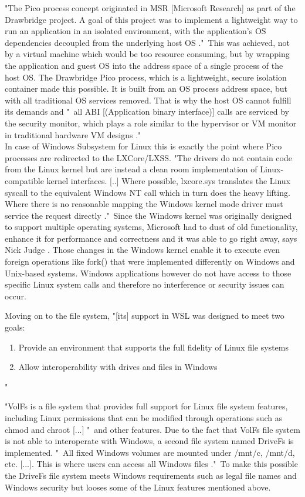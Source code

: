 \documentclass[utf8,biblatex, ngerman, english]{lni}
\begin{document}
"The Pico process concept originated in MSR [Microsoft Research] as part of the Drawbridge project. A goal of this project was to implement a lightweight way to run an application in an isolated environment, with the application’s OS dependencies decoupled from the underlying host OS \cite{Ha16a}."\ This was achieved, not by a virtual machine which would be too resource consuming, but by wrapping the application and guest OS into the address space of a single process of the host OS. The Drawbridge Pico process, which is a lightweight, secure isolation container made this possible. It is built from an OS process address space, but with all traditional OS services removed. That is why the host OS cannot fulfill its demands and "\ all ABI [(Application binary interface)] calls are serviced by the security monitor, which plays a role similar to the hypervisor or VM monitor in traditional hardware VM designs \cite{11}."\\
In case of Windows Subsystem for Linux this is exactly the point where Pico processes are redirected to the LXCore/LXSS. "The drivers do not contain code from the Linux kernel but are instead a clean room implementation of Linux-compatible kernel interfaces. [..] Where possible, lxcore.sys translates the Linux syscall to the equivalent Windows NT call which in turn does the heavy lifting. Where there is no reasonable mapping the Windows kernel mode driver must service the request directly \cite{Ha16b}."\ Since the Windows kernel was originally designed to support multiple operating systems, Microsoft had to dust of old functionality, enhance it for performance and correctness and it was able to go right away, says Nick Judge \cite{Ha16a}. Those changes in the Windows kernel enable it to execute even foreign operations like fork() that were implemented differently on Windows and Unix-based systems. Windows applications however do not have access to those specific Linux system calls and therefore no interference or security issues can occur.

Moving on to the file system, "[its] support in WSL was designed to meet two goals:
\begin{enumerate}
    \item Provide an environment that supports the full fidelity of Linux file systems
    \item Allow interoperability with drives and files in Windows 
\end{enumerate} \cite{Ha16b}"

"VolFs is a file system that provides full support for Linux file system features, including Linux permissions that can be modified through operations such as chmod and chroot [...] \cite{Ha16b}"\ and other features. Due to the fact that VolFs file system is not able to interoperate with Windows, a second file system named DriveFs is implemented. "\ All fixed Windows volumes are mounted under /mnt/c, /mnt/d, etc. [...]. This is where users can access all Windows files \cite{Ha16b}."\ To make this possible the DriveFs file system meets Windows requirements such as legal file names and Windows security but looses some of the Linux features mentioned above.
\end{document}
